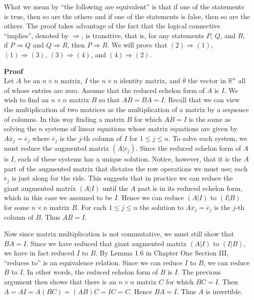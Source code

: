 \documentclass[12pt]{article}
\def\bar#1{\overline{#1}}
\def\th{\theta} \def\al{\alpha} \def\ba{\beta} \def\ga{\gamma}
\def\R{\mathbb{R}} \def\Q{\mathbb{Q}} \def\N{\mathbb{N}} \def\Z{\mathbb{Z}} \def\P{\mathbb{P}}
\begin{document}
What we mean by ``the following are equivalent'' is that if one of the statements is true, then so are the others and if one of the statements is false, then so are the others. The proof takes advantage of the fact that the logical connective ``implies'', denoted by $\Rightarrow$, is transitive, that is, for any statements $P$, $Q$, and $R$, if $P \Rightarrow Q$ and $Q \Rightarrow R$, then $P \Rightarrow R$. We will prove that $(2) \Rightarrow (1)$, $(1) \Rightarrow (3)$, $(3) \Rightarrow (4)$, and $(4) \Rightarrow (2)$.

{\bf Proof} \\
Let $A$ be an $n \times n$ matrix, $I$ the $n \times n$ identity matrix, and $\bar{\th}$ the vector in $\R^n$ all of whose entries are zero. Assume that the reduced echelon form of $A$ is $I$. We wish to find an $n \times n$ matrix $B$ so that $AB = BA = I$. Recall that we can view the multiplication of two matrices as the multiplication of a matrix by a sequence of columns. In this way finding a matrix $B$ for which $AB = I$ is the same as solving the $n$ systems of linear equations whose matrix equations are given by $A\bar{x}_j = \bar{e}_j$ where $\bar{e}_j$ is the $j$-th column of $I$ for $1 \leq j \leq n$. To solve each system, we must reduce the augmented matrix $(A | \bar{e}_j)$. Since the reduced echelon form of $A$ is $I$, each of these systems has a unique solution. Notice, however, that it is the 
$A$ part of the augmented matrix that dictates the row operations we must use; each $\bar{e}_j$ is just along for the ride. This suggests that in practice we can reduce the giant augmented matrix $(A | I)$ until the $A$ part is in its reduced echelon form, which in this case we assumed to be $I$. Hence we can reduce $(A | I)$ to $(I | B)$ for some $n \times n$ matrix $B$. For each $1 \leq j \leq n$ the solution to $A\bar{x}_j = \bar{e}_j$ is the $j$-th column of $B$. Thus $AB = I$.

Now since matrix multiplication is not commutative, we must still show that $BA = I$. Since we have reduced that giant augmented matrix $(A | I)$ to $(I | B)$, we have in fact reduced $I$ to $B$. By Lemma 1.6 in Chapter One Section III, ``reduces to'' is an equivalence relation. Since we can reduce $I$ to $B$, we can reduce $B$ to $I$. In other words, the reduced echelon form of $B$ is $I$. The previous argument then shows that there is an $n \times n$ matrix $C$ for which $BC = I$. Then $A = AI = A(BC) = (AB)C = IC = C$. Hence $BA = I$. Thus $A$ is invertible.
\end{document}
